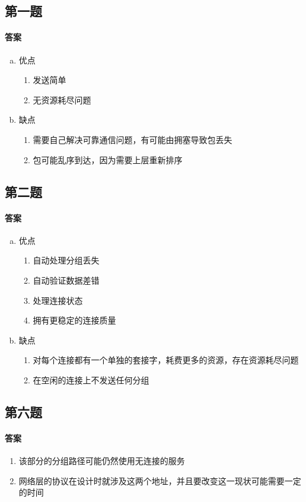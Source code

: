 \documentclass[UTF8]{article}
\begin{document}
\subsection{第一题}
\paragraph{答案}
\begin{enumerate}[a.]
    \item 优点 
    \begin{enumerate}[1]
        \item 发送简单
        \item 无资源耗尽问题
    \end{enumerate}
    \item 缺点
    \begin{enumerate}[1]
        \item 需要自己解决可靠通信问题，有可能由拥塞导致包丢失
        \item 包可能乱序到达，因为需要上层重新排序
    \end{enumerate}
\end{enumerate}
\subsection{第二题}
\paragraph{答案}
\begin{enumerate}[a.]
    \item 优点 
    \begin{enumerate}[1]
        \item 自动处理分组丢失
        \item 自动验证数据差错
        \item 处理连接状态
        \item 拥有更稳定的连接质量
    \end{enumerate}
    \item 缺点
    \begin{enumerate}[1]
        \item 对每个连接都有一个单独的套接字，耗费更多的资源，存在资源耗尽问题
        \item 在空闲的连接上不发送任何分组
    \end{enumerate}
\end{enumerate}
\subsection{第六题}
\paragraph{答案}
\begin{enumerate}
    \item 该部分的分组路径可能仍然使用无连接的服务
    \item 网络层的协议在设计时就涉及这两个地址，并且要改变这一现状可能需要一定的时间
\end{enumerate}
\end{document}
